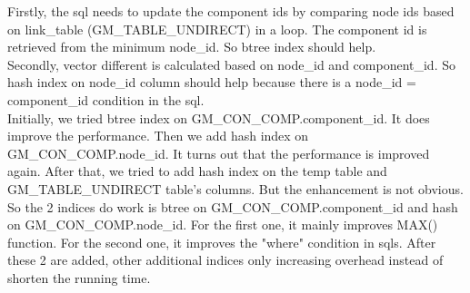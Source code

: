 Firstly, the sql needs to update the component ids by comparing node ids based on link\_table (GM\_TABLE\_UNDIRECT) in a loop. The component id is retrieved from the minimum node\_id. So btree index should help. \\
Secondly, vector different is calculated based on node\_id and component\_id. So hash index on node\_id column should help because there is a node\_id = component\_id condition in the sql. \\
Initially, we tried btree index on GM\_CON\_COMP.component\_id. It does improve the performance. Then we add hash index on GM\_CON\_COMP.node\_id. It turns out that the performance is improved again. After that, we tried to add hash index on the temp table and GM\_TABLE\_UNDIRECT table's columns. But the enhancement is not obvious. \\
So the 2 indices do work is btree on GM\_CON\_COMP.component\_id and hash on GM\_CON\_COMP.node\_id. For the first one, it mainly improves MAX() function. For the second one, it improves the "where" condition in sqls. After these 2 are added, other additional indices only increasing overhead instead of shorten the running time. \\
\\
\\

